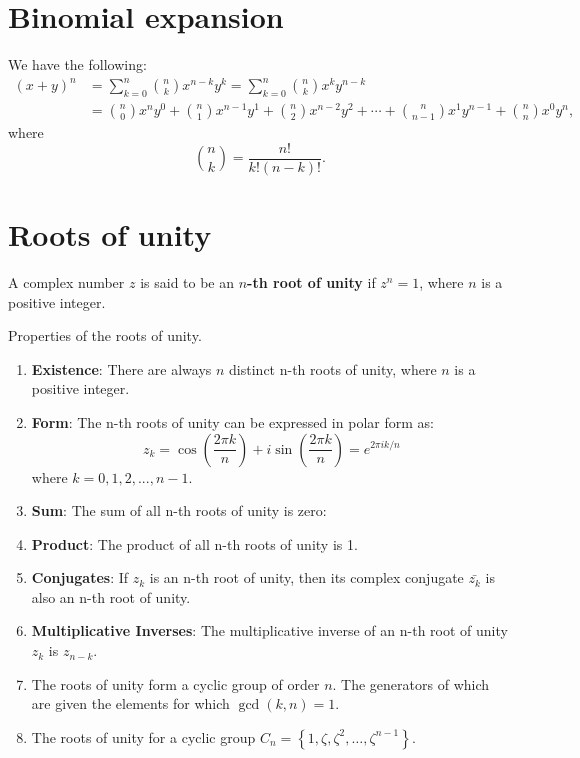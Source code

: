 \documentclass[12pt, a4paper]{article}
\begin{document}
\section{Binomial expansion}

We have the following:
\[\begin{aligned}
    (x + y)^n &= \sum_{k=0}^{n} \binom{n}{k} x^{n-k} y^k = \sum_{k=0}^{n} \binom{n}{k} x^k y^{n-k} \\
    &=\binom{n}{0}x^n y^0 + \binom{n}{1}x^{n-1}y^1 + \binom{n}{2}x^{n-2}y^2 + \cdots + \binom{n}{n-1}x^1 y^{n-1} + \binom{n}{n}x^0 y^n,
\end{aligned}\]
where
\[\binom{n}{k} = \frac{n!}{k!(n - k)!}.\]

\section{Roots of unity}
\begin{definition}
    A complex number $z$ is said to be an \textbf{$n$-th root of unity} if $z^n = 1$, where $n$ is a positive integer.
\end{definition}

\begin{mdprop}
    Properties of the roots of unity.
    \begin{enumerate}
    \item \textbf{Existence}: There are always \(n\) distinct n-th roots of unity, where \(n\) is a positive integer.
    \item \textbf{Form}: The n-th roots of unity can be expressed in polar form as:
    \[z_k = \cos\left(\frac{2\pi k}{n}\right) + i \sin\left(\frac{2\pi k}{n}\right) = e^{2\pi i k/n}\]
    where \(k = 0, 1, 2, ..., n-1\).
    \item \textbf{Sum}: The sum of all n-th roots of unity is zero:
    \item \textbf{Product}: The product of all n-th roots of unity is 1.
    \item \textbf{Conjugates}: If \(z_k\) is an n-th root of unity, then its complex conjugate \(\bar{z_k}\) is also an n-th root of unity.
    \item \textbf{Multiplicative Inverses}: The multiplicative inverse of an n-th root of unity \(z_k\) is \(z_{n-k}\).
    \item The roots of unity form a cyclic group of order \(n\). The generators of which are given the elements for which \(\gcd(k,n)=1\).
    \item The roots of unity for a cyclic group \(C_n=\left\{ 1,\zeta,\zeta^2,\ldots,\zeta^{n-1} \right\}\).
\end{enumerate}

\end{mdprop}
\end{document}
